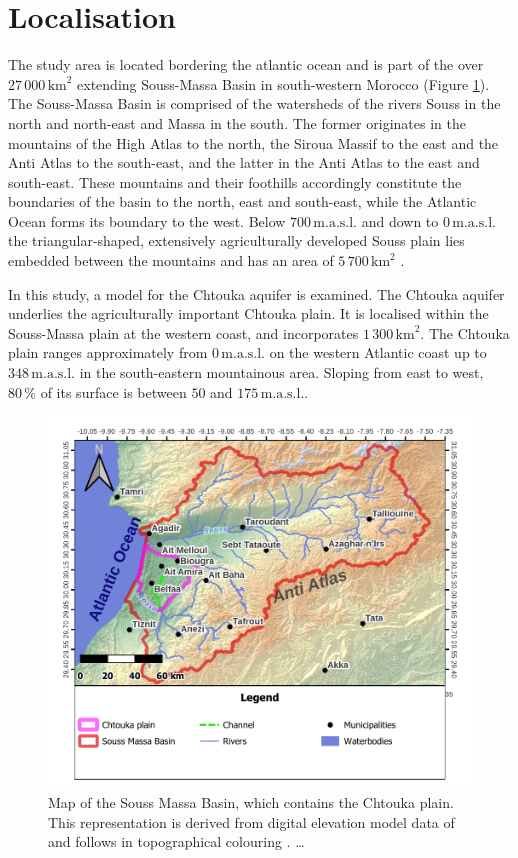 \section{Localisation}

The study area is located bordering the atlantic ocean and is part of the over $27 \, 000 \, \textrm{km}^2$ extending Souss-Massa Basin in south-western Morocco (Figure \ref{Map-SoussMassaRegion}). The Souss-Massa Basin is comprised of the watersheds of the rivers Souss in the north and north-east and Massa in the south. The former originates in the mountains of the High Atlas to the north, the Siroua Massif to the east and the Anti Atlas to the south-east, and the latter in the Anti Atlas to the east and south-east. These mountains and their foothills accordingly constitute the boundaries of the basin to the north, east and south-east, while the Atlantic Ocean forms its boundary to the west. Below $700 \, \textrm{m.a.s.l.}$ and down to $0 \, \textrm{m.a.s.l.}$ the triangular-shaped, extensively agriculturally developed Souss plain lies embedded between the mountains and has an area of $5 \, 700 \, \textrm{km}^2$ \parencite{Choukr.2017}.
    
In this study, a model for the Chtouka aquifer is examined. The Chtouka aquifer underlies the agriculturally important Chtouka plain. It is localised within the Souss-Massa plain at the western coast, and incorporates $1 \, 300 \, \textrm{km}^2$. The Chtouka plain ranges approximately from $0 \, \textrm{m.a.s.l.}$ on the western Atlantic coast up to $348 \, \textrm{m.a.s.l.}$ in the south-eastern mountainous area. Sloping from east to west, $80 \, \%$ of its surface is between $50$ and $175 \, \textrm{m.a.s.l.}$.

\begin{figure}[h]
    \centering
    \includegraphics[width=1.0\textwidth]{./img/Map_SoussMassa.pdf}
    \caption{Map of the Souss Massa Basin, which contains the Chtouka plain. This representation is derived from digital elevation model data of \textcite{NASA.SRTM1Arc} and follows in topographical colouring \textcite{Hssaisoune.2017}. \dots}
    \label{Map-SoussMassaRegion}
\end{figure}


